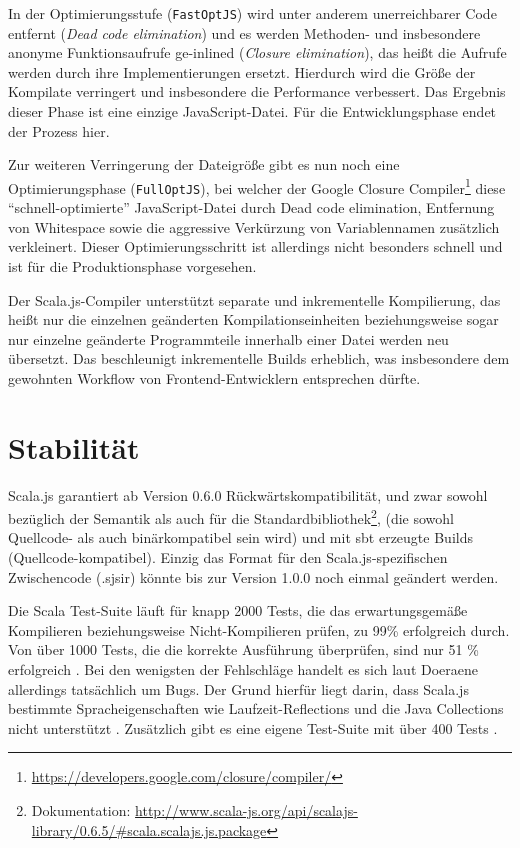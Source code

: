 \documentclass[a4paper, 12pt, hidelinks, listof=totoc, listoftables=totoc, bibliography=totoc]{scrreprt}
\newcommand{\code}[1]{\lstinline[language=Scala, style=inline]|#1|}
\begin{document}
In der Optimierungsstufe (\code{FastOptJS}) wird unter anderem unerreichbarer Code entfernt (\emph{Dead code elimination}) und es werden Methoden- und insbesondere anonyme Funktionsaufrufe ge-inlined (\emph{Closure elimination}), das heißt die Aufrufe werden durch ihre Implementierungen ersetzt. Hierdurch wird die Größe der Kompilate verringert und insbesondere die Performance verbessert. Das Ergebnis dieser Phase ist eine einzige JavaScript-Datei. Für die Entwicklungsphase endet der Prozess hier.

Zur weiteren Verringerung der Dateigröße gibt es nun noch eine Optimierungsphase (\code{FullOptJS}), bei welcher der Google Closure Compiler\footnote{\url{https://developers.google.com/closure/compiler/}} diese "`schnell-optimierte"' JavaScript-Datei durch Dead code elimination, Entfernung von Whitespace sowie die aggressive Verkürzung von Variablennamen zusätzlich verkleinert. Dieser Optimierungsschritt ist allerdings nicht besonders schnell und ist für die Produktionsphase vorgesehen.
\cite[Vgl.][]{scalajs.DCO}\cite[Vgl.][\#HowCompilationWorks]{haoyi.HOS}

Der Scala.js-Compiler unterstützt separate und inkrementelle Kompilierung, das heißt nur die einzelnen geänderten Kompilationseinheiten beziehungsweise sogar nur einzelne geänderte Programmteile innerhalb einer Datei werden neu übersetzt. Das beschleunigt inkrementelle Builds erheblich, was insbesondere dem gewohnten Workflow von Frontend-Entwicklern entsprechen dürfte.


\section{Stabilität}

Scala.js garantiert ab Version 0.6.0 Rückwärtskompatibilität, und zwar sowohl bezüglich der Semantik als auch für die Standardbibliothek\footnote{Dokumentation: \url{http://www.scala-js.org/api/scalajs-library/0.6.5/\#scala.scalajs.js.package}}, (die sowohl Quellcode- als auch binärkompatibel sein wird) und mit sbt erzeugte Builds (Quellcode-kompatibel). Einzig das Format für den Scala.js-spezifischen Zwischencode (.sjsir) könnte bis zur Version 1.0.0 noch einmal geändert werden.

Die Scala Test-Suite läuft für knapp 2000 Tests, die das erwartungsgemäße Kompilieren beziehungsweise Nicht-Kompilieren prüfen, zu 99\% erfolgreich durch. Von über 1000 Tests, die die korrekte Ausführung überprüfen, sind nur 51 \% erfolgreich \cite[Folie 36, Min. 35]{doeraene2014.WHB}. Bei den wenigsten der Fehlschläge handelt es sich laut Doeraene allerdings tatsächlich um Bugs. Der Grund hierfür liegt darin, dass Scala.js bestimmte Spracheigenschaften wie Laufzeit-Reflections und die Java Collections nicht unterstützt \cite[S. 7]{doeraene2013.TDI}. Zusätzlich gibt es eine eigene Test-Suite mit über 400 Tests \cite[Folie 36, Min. 35]{doeraene2014.WHB}.
\end{document}

